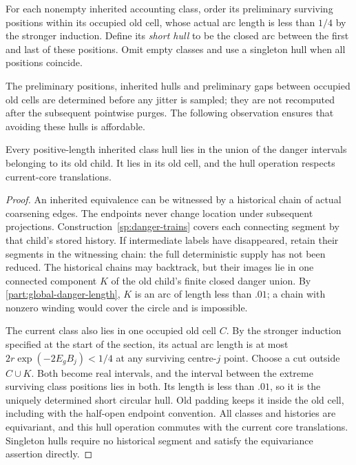 For each nonempty inherited accounting class, order its preliminary
surviving positions within its occupied old cell, whose actual arc
length is less than $1/4$ by the stronger induction.  Define its
\emph{short hull} to be the closed arc between the first and last
of these positions.  Omit empty classes and use a singleton hull
when all positions coincide.

The preliminary positions, inherited hulls and preliminary gaps
between occupied old cells are determined before any jitter is
sampled; they are not recomputed after the subsequent pointwise
purges.  The following observation ensures
that avoiding these hulls is affordable.

\begin{lemma}
\label{part:inherited-hulls}
Every positive-length inherited class hull lies in the union of
the danger intervals belonging to its old child.  It lies in its
old cell, and the hull operation respects current-core translations.
\end{lemma}

\begin{proof}
An inherited equivalence can be witnessed by a historical chain
of actual coarsening edges.  The endpoints never change location
under subsequent projections.  Construction~\ref{sp:danger-trains}
covers each connecting segment by that child's stored history.
If intermediate labels have disappeared, retain their segments
in the witnessing chain: the full deterministic supply has not
been reduced.  The historical chains may backtrack, but their
images lie in one connected component $K$ of the old child's
finite closed danger union.  By
\eqref{part:global-danger-length}, $K$ is an arc of length less
than $.01$; a chain with nonzero winding would cover the circle
and is impossible.

The current class also lies in one occupied old cell $C$.  By the
stronger induction specified at the start of the section, its
actual arc length is at most $2r\exp(-2E_gB_j)<1/4$ at any
surviving centre-$j$ point.  Choose a cut outside $C\cup K$.
Both become real intervals, and the interval between the extreme
surviving class positions lies in both.  Its length is less than
$.01$, so it is the uniquely determined short circular hull.
Old padding keeps it inside the old cell, including with the
half-open endpoint convention.  All classes and histories are
equivariant, and this hull operation commutes with the current
core translations.  Singleton hulls require no historical segment
and satisfy the equivariance assertion directly.
\end{proof}

